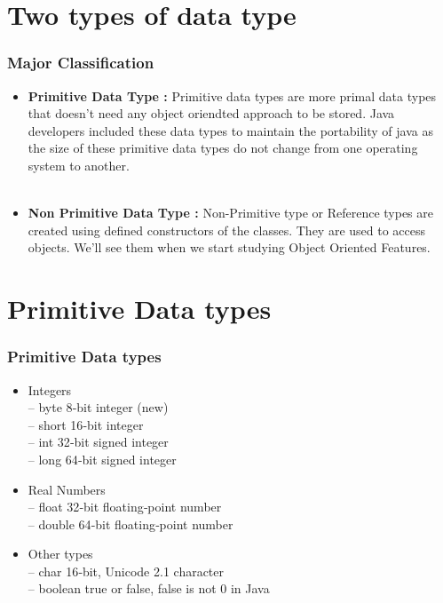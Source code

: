\documentclass{beamer}
\begin{document}
\section{Two types of data type}

\begin{frame}
\frametitle{Major Classification}
\begin{itemize}

\item \textbf{Primitive Data Type :}
Primitive data types are more primal data types that doesn't need any object oriendted approach to be stored. 
Java developers included these data types to maintain the portability of java as the size of these 
primitive data types do not change from one operating system to another.\\~\\

\item \textbf{Non Primitive Data Type :} 
Non-Primitive type or Reference types are created using defined constructors of the classes. 
They are used to access objects. We'll see them when we start studying Object Oriented Features. 


\end{itemize}
\end{frame}

\section{Primitive Data types}


\begin{frame}
\frametitle{Primitive Data types}
\begin{itemize}
\item Integers\\
–  byte 8‐bit integer (new)\\
– short 16‐bit integer\\
– int 32‐bit signed integer\\
– long 64‐bit signed integer\\
\item Real Numbers\\
– float 32‐bit floating‐point number\\
– double 64‐bit floating‐point number\\
\item Other types\\
– char 16‐bit, Unicode 2.1 character\\
– boolean true or false, false is not 0 in Java\\

\end{itemize}
\end{frame}
\end{document}
